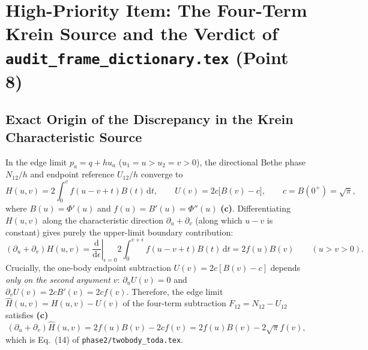 \documentclass[11pt,a4paper]{article}
\newcommand{\dd}{\mathrm{d}}
\begin{document}
\section{High-Priority Item: The Four-Term Krein Source and the Verdict of \texttt{audit\_frame\_dictionary.tex} (Point 8)}
\label{sec:krein}

\subsection{Exact Origin of the Discrepancy in the Krein Characteristic Source}

In the edge limit $p_a=q+h u_a$ ($u_1=u>u_2=v>0$), the directional Bethe phase $N_{12}/h$ and endpoint reference $U_{12}/h$ converge to
\begin{equation}\label{eq:H_and_U}
  H(u,v) = 2\int_0^v f(u-v+t)B(t)\,\dd t, \qquad U(v) = 2c\bigl[B(v)-c\bigr], \qquad c = B(0^+) = \sqrt{\pi},
\end{equation}
where $B(u)=\Phi'(u)$ and $f(u)=B'(u)=\Phi''(u)$ \textbf{(c)}. Differentiating $H(u,v)$ along the characteristic direction $\partial_u+\partial_v$ (along which $u-v$ is constant) gives purely the upper-limit boundary contribution:
\begin{equation}\label{eq:char_H}
  (\partial_u+\partial_v)H(u,v) = \left.\frac{\dd}{\dd\epsilon}\right|_{\epsilon=0} 2\int_0^{v+\epsilon} f(u-v+t)B(t)\,\dd t = 2f(u)B(v) \qquad (u>v>0).
\end{equation}
Crucially, the one-body endpoint subtraction $U(v)=2c[B(v)-c]$ depends \emph{only on the second argument $v$}: $\partial_u U(v)=0$ and $\partial_v U(v)=2cB'(v)=2cf(v)$. Therefore, the edge limit $\widehat{H}(u,v)=H(u,v)-U(v)$ of the four-term subtraction $F_{12}=N_{12}-U_{12}$ satisfies \textbf{(c)}
\begin{equation}\label{eq:true_krein_source}
  (\partial_u+\partial_v)\widehat{H}(u,v) = 2f(u)B(v) - 2cf(v) = 2f(u)B(v) - 2\sqrt{\pi}f(v),
\end{equation}
which is Eq.~(14) of \texttt{phase2/twobody\_toda.tex}.
\end{document}
